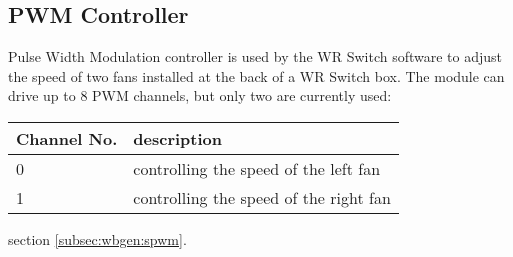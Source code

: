 \subsection{PWM Controller}


Pulse Width Modulation controller is used by the WR Switch software to adjust the
speed of two fans installed at the back of a WR Switch box. The module can drive
up to 8 PWM channels, but only two are currently used:

\begin{center}
  \begin{tabular}{|l|l|}
    \hline
    Channel No. & description\\
    \hline \hline
    0 & controlling the speed of the left fan\\
    1 & controlling the speed of the right fan\\
    \hline
  \end{tabular}
\end{center}

\vspace{12pt}
 section \ref{subsec:wbgen:spwm}.
